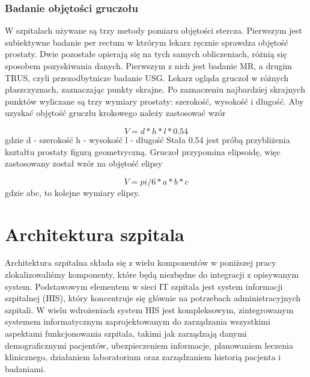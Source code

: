 \documentclass[a4paper,11pt,twoside]{report}
\theoremstyle{definition}
\begin{document}
\subsubsection{Badanie objętości gruczołu}
W szpitalach używane są trzy metody pomiaru objętości stercza. Pierwszym jest subiektywne badanie per rectum w ktrórym lekarz ręcznie sprawdza objętość prostaty. Dwie pozostałe opierają się na tych samych obliczeniach, różnią się sposobem pozyskiwania danych. Pierwszym z nich jest badanie MR, a drugim TRUS, czyli przezodbytnicze badanie USG. Lekarz ogląda gruczoł w różnych płaszczyznach, zaznaczając punkty skrajne. Po zaznaczeniu najbardziej skrajnych punktów wyliczane są trzy wymiary prostaty: szerokość, wysokość i długość. Aby uzyskać objętość gruczłu krokowego należy zastosować wzór 

\[V = d * h * l * 0.54\]
gdzie
d - szerokość
h - wysokość
l - długość
Stała 0.54 jest próbą przybliżenia kształtu prostaty figurą geometryczną. Gruczoł przypomina elipsoidę, więc zastosowany został wzór na objętość elipsy

\[V = pi/6 * a*b*c\]
gdzie abc, to kolejne wymiary elipsy. 

\section{Architektura szpitala}

Architektura szpitalna składa się z wielu komponentów w poniższej pracy zlokalizowaliśmy komponenty, które będą niezbędne do integracji z opisywanym system. Podstawowym elementem w sieci IT szpitala jest system informacji szpitalnej (HIS), który koncentruje się głównie na potrzebach administracyjnych szpitali. W wielu wdrożeniach system HIS jest kompleksowym, zintegrowanym systemem informatycznym zaprojektowanym do zarządzania wszystkimi aspektami funkcjonowania szpitala, takimi jak zarządzają danymi demograficznymi pacjentów, ubezpieczeniem informacje, planowaniem leczenia klinicznego, działaniem laboratorium oraz zarządzaniem historią pacjenta i badaniami.
\end{document}
